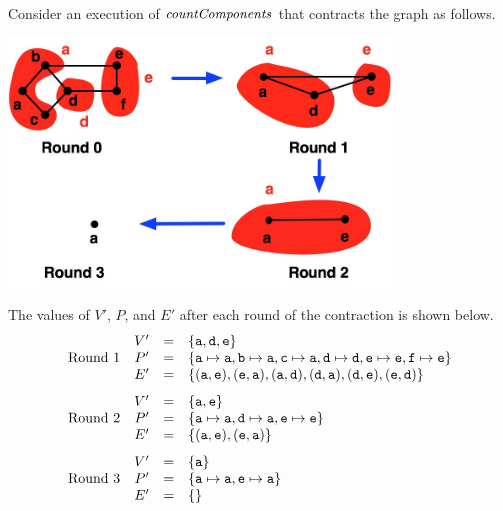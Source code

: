 \begin{flex}
\begin{algorithm}
\end{algorithm}

\begin{example}
\label{ex:graphcon::connect::cc}

Consider an execution of $\mathit{countComponents}$ that contracts the graph as follows.

\begin{center}
\includegraphics[width=4in]{./graph-contraction/media-connectivity/graph-contraction-example-1.jpg}
\end{center}
  
The values of $V'$, $P$, and $E'$ after each round of the 
contraction is shown below.
\[
\begin{array}{crcl}
  & V' & = & \left\{ \texttt{a},\texttt{d},\texttt{e} \right\}\\
\mbox{Round } 1 & P' & = & 
 \left\{ \texttt{a} \mapsto \texttt{a}, 
       \texttt{b} \mapsto \texttt{a}, 
       \texttt{c} \mapsto \texttt{a}, 
       \texttt{d} \mapsto \texttt{d}, 
       \texttt{e} \mapsto \texttt{e}, 
       \texttt{f} \mapsto \texttt{e} \right\}\\
  & E' & = & \left\{ (\texttt{a},\texttt{e}),
               (\texttt{e},\texttt{a}),
               (\texttt{a},\texttt{d}),
               (\texttt{d},\texttt{a}),
               (\texttt{d},\texttt{e}),
               (\texttt{e},\texttt{d}) \right\}\\[.1in]
  & V' & = & \left\{ \texttt{a},\texttt{e} \right\}\\
\mbox{Round } 2 & P' & = & 
 \left\{ \texttt{a} \mapsto \texttt{a}, 
       \texttt{d} \mapsto \texttt{a}, 
       \texttt{e} \mapsto \texttt{e} \right\}\\
  & E' & = & \left\{ (\texttt{a},\texttt{e}),
               (\texttt{e},\texttt{a}) \right\}\\[.1in]
  & V' & = & \left\{ \texttt{a} \right\}\\
\mbox{Round } 3 & P' & = & 
 \left\{ \texttt{a} \mapsto \texttt{a}, 
       \texttt{e} \mapsto \texttt{a} \right\}\\
  & E' & = & \left\{  \right\}
\end{array}
\]
\end{example}

\end{flex}


